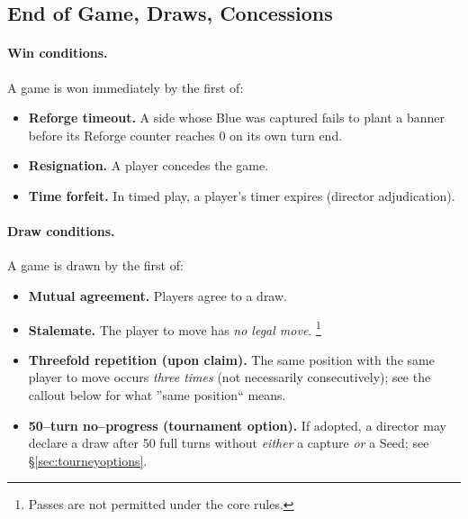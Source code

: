 \documentclass[11pt]{article}
\begin{document}
\subsection{End of Game, Draws, Concessions}
\label{sec:endgame}

\paragraph{Win conditions.}
A game is won immediately by the first of:
\begin{itemize}[leftmargin=1.3em,itemsep=0.25em]
  \item \textbf{Reforge timeout.} A side whose Blue was captured fails to plant a banner before its Reforge counter reaches 0 on its own turn end.
  \item \textbf{Resignation.} A player concedes the game.
  \item \textbf{Time forfeit.} In timed play, a player's timer expires (director adjudication).
\end{itemize}

\paragraph{Draw conditions.}
A game is drawn by the first of:
\begin{itemize}[leftmargin=1.3em,itemsep=0.25em]
  \item \textbf{Mutual agreement.} Players agree to a draw.
  \item \textbf{Stalemate.} The player to move has \emph{no legal move}.%
  \footnote{Passes are not permitted under the core rules.}
  \item \textbf{Threefold repetition (upon claim).} The same position with the same player to move occurs \emph{three times} (not necessarily consecutively); see the callout below for what ''same position`` means.
  \item \textbf{50--turn no--progress (tournament option).} If adopted, a director may declare a draw after 50 full turns without \emph{either} a capture \emph{or} a Seed; see §\ref{sec:tourneyoptions}.
\end{itemize}
\end{document}
